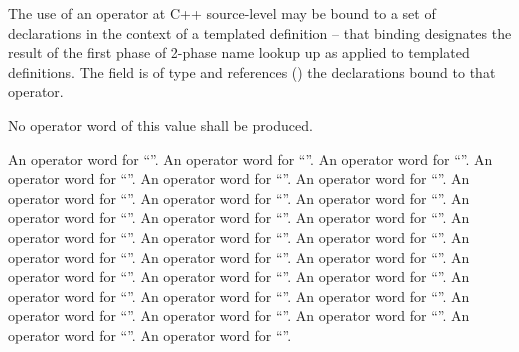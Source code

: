 The use of an operator at C++ source-level may be bound to a set of
declarations in the context of a templated definition -- that binding designates
the result of the first phase of 2-phase name lookup up as applied to 
templated definitions.   The  field is of type 
and references () the declarations bound 
to that operator.

No operator word of this value shall be produced.

 An operator word for ``\code{=}''.
  An operator word for ``\code{,}''.
   An operator word for ``\code{!}''.
   An operator word for ``\code{+}''.
   An operator word for ``\code{-}''.
   An operator word for ``\code{*}''.
   An operator word for ``\code{/}''.
   An operator word for ``\code{\%}''.
   An operator word for ``\code{<<}''.
   An operator word for ``\code{>>}''.
   An operator word for ``\code{\~}''.
   An operator word for ``\code{\^}''.
   An operator word for ``\code{|}''.
   An operator word for ``\code{\&}''.
   An operator word for ``\code{++}''.
   An operator word for ``\code{--}''.
   An operator word for ``\code{<}''.
   An operator word for ``\code{<=}''.
   An operator word for ``\code{>}''.
   An operator word for ``\code{>=}''.
   An operator word for ``\code{==}''.
   An operator word for ``\code{\!=}''.
   An operator word for ``\code{<=>}''.
   An operator word for ``\code{+=}''.
   An operator word for ``\code{-=}''.
   An operator word for ``\code{*=}''.
   An operator word for ``\code{/=}''.
   An operator word for ``\code{\%=}''.
   An operator word for ``\code{\&=}''.
